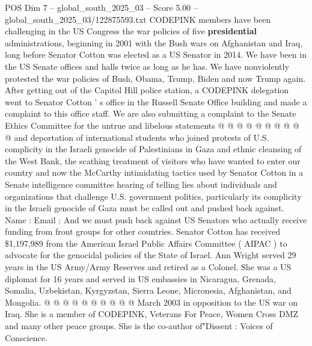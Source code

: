 \begin{textsample}{POS Dim 7 – global\_south\_2025\_03 – Score 5.00 – global\_south\_2025\_03/122875593.txt}
CODEPINK members have been challenging in the US Congress the war policies of five \textbf{presidential} administrations, beginning in 2001 with the Bush wars on Afghanistan and Iraq, long before Senator Cotton was elected as a US Senator in 2014.
We have been in the US Senate offices and halls twice as long as he has.
We have nonviolently protested the war policies of Bush, Obama, Trump, Biden and now Trump again.
After getting out of the Capitol Hill police station, a CODEPINK delegation went to Senator Cotton ' s office in the Russell Senate Office building and made a complaint to this office staff.
We are also submitting a complaint to the Senate Ethics Committee for the untrue and libelous statements @ @ @ @ @ @ @ @ @ @ and deportation of international students who joined protests of U.S. complicity in the Israeli genocide of Palestinians in Gaza and ethnic cleansing of the West Bank, the scathing treatment of visitors who have wanted to enter our country and now the McCarthy intimidating tactics used by Senator Cotton in a Senate intelligence committee hearing of telling lies about individuals and organizations that challenge U.S. government politics, particularly its complicity in the Israeli genocide of Gaza must be called out and pushed back against.
Name : Email : And we must push back against US Senators who actually receive funding from front groups for other countries.
Senator Cotton has received \$1,197,989 from the American Israel Public Affairs Committee ( AIPAC ) to advocate for the genocidal policies of the State of Israel.
Ann Wright served 29 years in the US Army/Army Reserves and retired as a Colonel.
She was a US diplomat for 16 years and served in US embassies in Nicaragua, Grenada, Somalia, Uzbekistan, Kyrgyzstan, Sierra Leone, Micronesia, Afghanistan, and Mongolia. @ @ @ @ @ @ @ @ @ @ March 2003 in opposition to the US war on Iraq.
She is a member of CODEPINK, Veterans For Peace, Women Cross DMZ and many other peace groups.
She is the co-author of"Dissent : Voices of Conscience.

\end{textsample}
